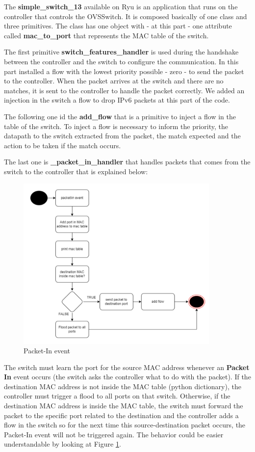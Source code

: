 \documentclass[
  oneside,
  11pt, a4paper,
  footinclude=true,
  headinclude=true,
  cleardoublepage=empty
]{scrbook}
\begin{document}
The \textbf{simple\_switch\_13} available on Ryu is an application that runs on the controller that controls the OVSSwitch. It is composed basically of one class and three primitives. The class has one object with - at this part - one attribute called \textbf{mac\_to\_port} that represents the MAC table of the switch.
\par
The first primitive \textbf{switch\_features\_handler} is used during the handshake between the controller and the switch to configure the communication\cite{ryubook}. In this part installed a flow with the lowest priority possible - zero - to send the packet to the controller. When the packet arrives at the switch and there are no matches, it is sent to the controller to handle the packet correctly. We added an injection in the switch a flow to drop IPv6 packets at this part of the code.
\par
The following one id the \textbf{add\_flow} that is a primitive to inject a flow in the table of the switch. To inject a flow is necessary to inform the priority, the datapath to the switch extracted from the packet, the match expected and the action to be taken if the match occurs.
\par
The last one is  \textbf{\_packet\_in\_handler} that handles packets that comes from the switch to the controller that is explained below: 

\begin{figure}[H]
\centering
\includegraphics[width=10cm]{img/controllerdiagram.png}
\caption{Packet-In event}
\label{Packet-in}
\end{figure}

The switch must learn the port for the source MAC address whenever an \textbf{Packet In} event occurs (the switch asks the controller what to do with the packet). If the destination MAC address is not inside the MAC table (python dictionary), the controller must trigger a flood to all ports on that switch. Otherwise, if the destination MAC address is inside the MAC table, the switch must forward the packet to the specific port related to the destination and the controller adds a flow in the switch so for the next time this source-destination packet occurs, the Packet-In event will not be triggered again. The behavior could be easier understandable by looking at Figure \ref{Packet-in}. 
\end{document}
